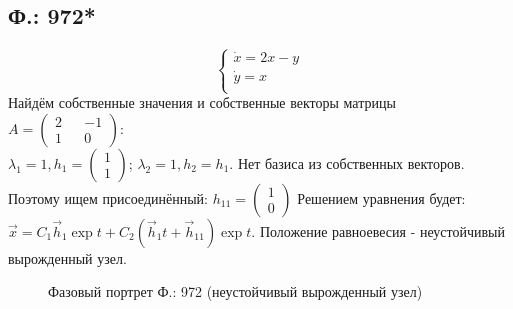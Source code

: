 \documentclass{article}
\begin{document}
\subsection{Ф.: 972*}
\begin{equation}
\begin{cases}
        \dot{x}=2x-y\\
        \dot{y}=x\\
    \end{cases}    
\end{equation}
Найдём собственные значения и собственные векторы матрицы $A=\begin{pmatrix}2 && -1 \\ 1 && 0 \end{pmatrix}$:\\
 $\lambda_1= 1,h_1 = \begin{pmatrix}1  \\  1 \end{pmatrix} $; $\lambda_2= 1,h_2 = h_1$. Нет базиса из собственных векторов. Поэтому ищем присоединённый: $h_{11} =\begin{pmatrix}1  \\  0 \end{pmatrix} $ Решением уравнения будет: $\vec x= C_1 \vec h_1 \exp{t}+C_2 ( \vec h_1 t + \vec h_{11})\exp{t}$. Положение равноевесия - неустойчивый вырожденный узел. 
 \begin{figure}[ht]
\caption{Фазовый портрет Ф.: 972 (неустойчивый вырожденный узел) }
\label{972}
\end{figure}
\end{document}
